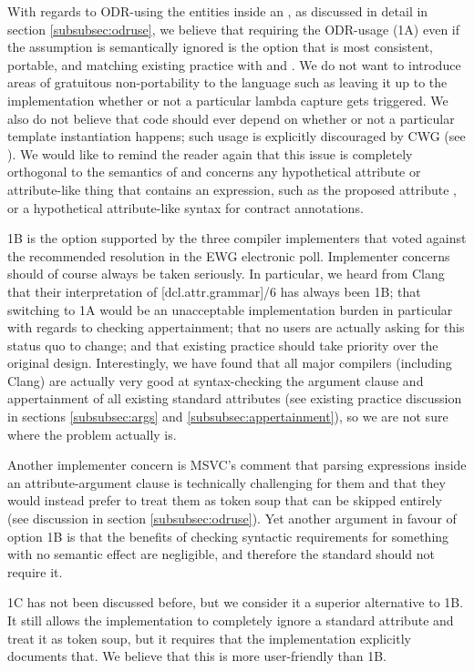 With regards to ODR-using the entities inside an , as discussed in detail in section \ref{subsubsec:odruse}, we believe that requiring the ODR-usage (1A) even if the assumption is semantically ignored is the option that is most consistent, portable, and matching existing practice with  and . We do not want to introduce areas of gratuitous non-portability to the language such as leaving it up to the implementation whether or not a particular lambda capture gets triggered. We also do not believe that code should ever depend on whether or not a particular template instantiation happens; such usage is explicitly discouraged by CWG (see \cite{CWG2118}). We would like to remind the reader again that this issue is completely orthogonal to the semantics of  and concerns any hypothetical attribute or attribute-like thing that contains an expression, such as the proposed  attribute \cite{P1144R5}, or a hypothetical attribute-like syntax for contract annotations.
 
1B is the option supported by the three compiler implementers that voted against the recommended resolution in the EWG electronic poll. Implementer concerns should of course always be taken seriously. In particular, we heard from Clang that their interpretation of [dcl.attr.grammar]/6 has always been 1B; that switching to 1A would be an unacceptable implementation burden in particular with regards to checking  appertainment;  that no users are actually asking for this status quo to change; and that existing practice should take priority over the original design. Interestingly, we have found that all major compilers (including Clang) are actually very good at syntax-checking the argument clause and appertainment of all existing standard attributes (see existing practice discussion in sections \ref{subsubsec:args} and \ref{subsubsec:appertainment}), so we are not sure where the problem actually is.

Another implementer concern is MSVC's comment that parsing expressions inside an attribute-argument clause is technically challenging for them and that they would instead prefer to treat them as token soup that can be skipped entirely (see discussion in section \ref{subsubsec:odruse}). Yet another argument in favour of option 1B is that the benefits of checking syntactic requirements for something with no semantic effect are negligible, and therefore the standard should not require it.

1C has not been discussed before, but we consider it a superior alternative to 1B. It still allows the implementation to completely ignore a standard attribute and treat it as token soup, but it requires that the implementation explicitly documents that. We believe that this is more user-friendly than 1B.

